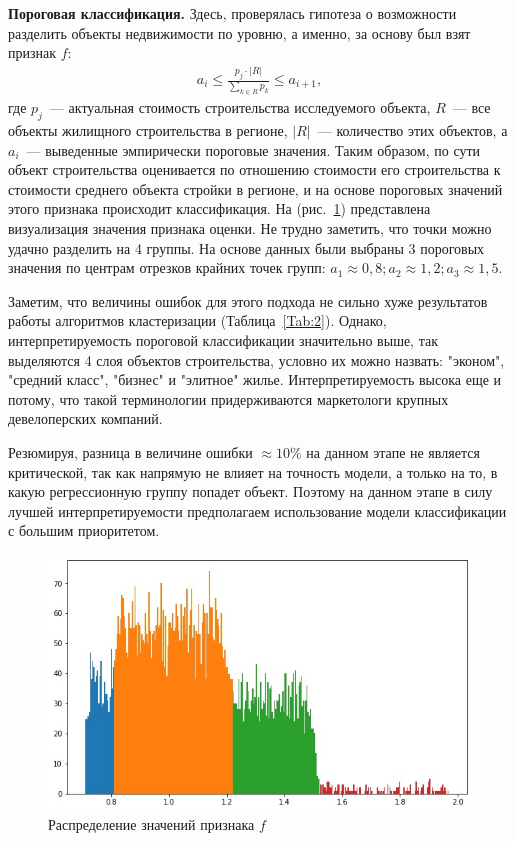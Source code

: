 \documentclass[12pt,a4paper]{article} %
\begin{document}
\textbf{Пороговая классификация.} Здесь, проверялась гипотеза о возможности разделить объекты недвижимости по уровню, а именно, за основу был взят признак $f$:
\begin{gather}\label{pklas1}
	a_i\leq \frac{p_j\cdot|R|}{\sum\limits_{k\in R} p_k}\leq a_{i+1},
\end{gather}
где $p_j$~--- актуальная стоимость строительства исследуемого объекта, $R$~--- все объекты жилищного строительства в регионе, $|R|$~--- количество этих объектов, а $a_i$~--- выведенные эмпирически пороговые значения. Таким образом, по сути объект строительства оценивается по отношению стоимости его строительства к стоимости среднего объекта стройки в регионе, и на основе пороговых значений этого признака происходит классификация. На (рис.~\ref{fig:porclas}) представлена визуализация значения признака оценки. Не трудно заметить, что точки можно удачно разделить на 4 группы. На основе данных были выбраны 3 пороговых значения по центрам отрезков крайних точек групп: $a_1 \approx 0,8; a_2 \approx 1,2; a_3 \approx 1,5$.

Заметим, что величины ошибок для этого подхода не сильно хуже результатов работы алгоритмов кластеризации (Таблица~\ref{Tab:2}). Однако, интерпретируемость пороговой классификации значительно выше, так выделяются 4 слоя объектов строительства, условно их можно назвать: "эконом", "средний класс", "бизнес" и "элитное" жилье. Интерпретируемость высока еще и потому, что такой терминологии придерживаются маркетологи крупных девелоперских компаний. 

Резюмируя, разница в величине ошибки $\approx10\%$ на данном этапе не является критической, так как напрямую не влияет на точность модели, а только на то, в какую регрессионную группу попадет объект. Поэтому на данном этапе в силу лучшей интерпретируемости предполагаем использование модели классификации с большим приоритетом.  

\begin{figure}[h]
	
	\centering
	
	\includegraphics[width=0.8\linewidth]{porclas.jpg}
	
	\caption{Распределение значений признака $f$ }
	
	\label{fig:porclas}
	
\end{figure} 
\end{document}
